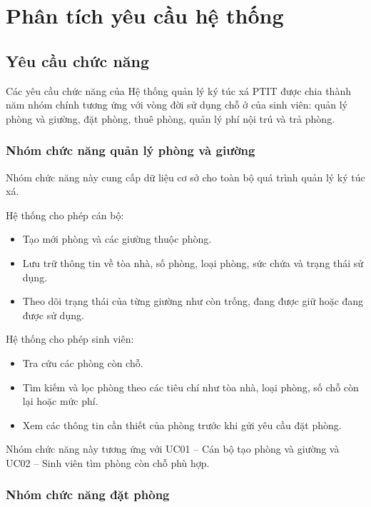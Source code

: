 \section{Phân tích yêu cầu hệ thống}

\subsection{Yêu cầu chức năng}

Các yêu cầu chức năng của Hệ thống quản lý ký túc xá PTIT được chia thành năm nhóm chính tương ứng với vòng đời sử dụng chỗ ở của sinh viên: quản lý phòng và giường, đặt phòng, thuê phòng, quản lý phí nội trú và trả phòng.

\subsubsection{Nhóm chức năng quản lý phòng và giường}

Nhóm chức năng này cung cấp dữ liệu cơ sở cho toàn bộ quá trình quản lý ký túc xá.

Hệ thống cho phép cán bộ:

\begin{itemize}[leftmargin=1.4em]
\item Tạo mới phòng và các giường thuộc phòng.
\item Lưu trữ thông tin về tòa nhà, số phòng, loại phòng, sức chứa và trạng thái sử dụng.
\item Theo dõi trạng thái của từng giường như còn trống, đang được giữ hoặc đang được sử dụng.
\end{itemize}

Hệ thống cho phép sinh viên:

\begin{itemize}[leftmargin=1.4em]
\item Tra cứu các phòng còn chỗ.
\item Tìm kiếm và lọc phòng theo các tiêu chí như tòa nhà, loại phòng, số chỗ còn lại hoặc mức phí.
\item Xem các thông tin cần thiết của phòng trước khi gửi yêu cầu đặt phòng.
\end{itemize}

Nhóm chức năng này tương ứng với UC01 – Cán bộ tạo phòng và giường và UC02 – Sinh viên tìm phòng còn chỗ phù hợp.

\subsubsection{Nhóm chức năng đặt phòng}

